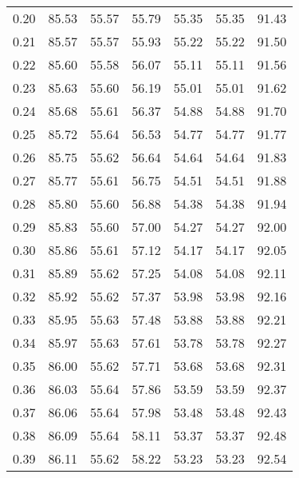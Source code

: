 \begin{tabular}{|c|c|c|c|c|c|c|}
      0.20 &     85.53 &     55.57 &      55.79 &   55.35 &      55.35 &         91.43 \\
      0.21 &     85.57 &     55.57 &      55.93 &   55.22 &      55.22 &         91.50 \\
      0.22 &     85.60 &     55.58 &      56.07 &   55.11 &      55.11 &         91.56 \\
      0.23 &     85.63 &     55.60 &      56.19 &   55.01 &      55.01 &         91.62 \\
      0.24 &     85.68 &     55.61 &      56.37 &   54.88 &      54.88 &         91.70 \\
      0.25 &     85.72 &     55.64 &      56.53 &   54.77 &      54.77 &         91.77 \\
      0.26 &     85.75 &     55.62 &      56.64 &   54.64 &      54.64 &         91.83 \\
      0.27 &     85.77 &     55.61 &      56.75 &   54.51 &      54.51 &         91.88 \\
      0.28 &     85.80 &     55.60 &      56.88 &   54.38 &      54.38 &         91.94 \\
      0.29 &     85.83 &     55.60 &      57.00 &   54.27 &      54.27 &         92.00 \\
      0.30 &     85.86 &     55.61 &      57.12 &   54.17 &      54.17 &         92.05 \\
      0.31 &     85.89 &     55.62 &      57.25 &   54.08 &      54.08 &         92.11 \\
      0.32 &     85.92 &     55.62 &      57.37 &   53.98 &      53.98 &         92.16 \\
      0.33 &     85.95 &     55.63 &      57.48 &   53.88 &      53.88 &         92.21 \\
      0.34 &     85.97 &     55.63 &      57.61 &   53.78 &      53.78 &         92.27 \\
      0.35 &     86.00 &     55.62 &      57.71 &   53.68 &      53.68 &         92.31 \\
      0.36 &     86.03 &     55.64 &      57.86 &   53.59 &      53.59 &         92.37 \\
      0.37 &     86.06 &     55.64 &      57.98 &   53.48 &      53.48 &         92.43 \\
      0.38 &     86.09 &     55.64 &      58.11 &   53.37 &      53.37 &         92.48 \\
      0.39 &     86.11 &     55.62 &      58.22 &   53.23 &      53.23 &         92.54 \\

\end{tabular}
